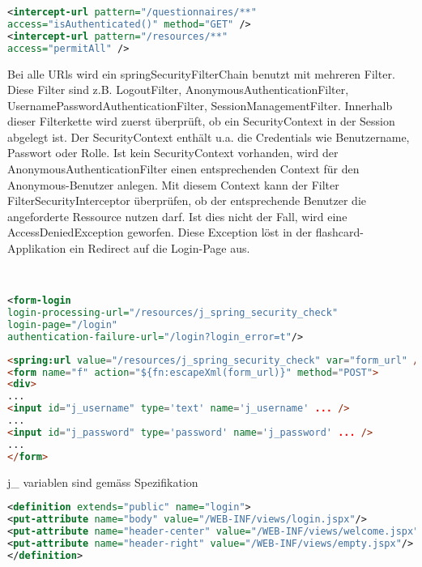 \documentclass[a4paper,10pt]{scrreprt}
\begin{document}
{\begin{description}
\begin{lstlisting}[caption=spring security xml,language=xml]
	<intercept-url pattern="/questionnaires/**"
access="isAuthenticated()" method="GET" />
<intercept-url pattern="/resources/**"
access="permitAll" />
\end{lstlisting}

\item[Authorizierung]  Bei alle URls wird ein springSecurityFilterChain benutzt mit mehreren Filter. Diese Filter sind z.B. LogoutFilter, AnonymousAuthenticationFilter,
UsernamePasswordAuthenticationFilter, SessionManagementFilter. Innerhalb dieser
Filterkette wird zuerst überprüft, ob ein SecurityContext in der Session abgelegt ist. Der
SecurityContext enthält u.a. die Credentials wie Benutzername, Passwort oder Rolle. Ist kein
SecurityContext vorhanden, wird der AnonymousAuthenticationFilter einen entsprechenden
Context für den Anonymous-Benutzer anlegen. Mit diesem Context kann der Filter
FilterSecurityInterceptor überprüfen, ob der entsprechende Benutzer die angeforderte
Ressource nutzen darf. Ist dies nicht der Fall, wird eine AccessDeniedException geworfen.
Diese Exception löst in der flashcard-Applikation ein Redirect auf die Login-Page aus.

\item[Leitung der Request auf Login Page] \hfill \\
\begin{lstlisting}[caption=security xml login weiterleitung,language=xml]
<form-login
login-processing-url="/resources/j_spring_security_check"
login-page="/login"
authentication-failure-url="/login?login_error=t"/>
\end{lstlisting}
	
\begin{lstlisting}[caption=login jspx spring security,language=html]
<spring:url value="/resources/j_spring_security_check" var="form_url" />
<form name="f" action="${fn:escapeXml(form_url)}" method="POST">
<div>
...
<input id="j_username" type='text' name='j_username' ... />
...
<input id="j_password" type='password' name='j_password' ... />
...
</form>
\end{lstlisting}

\begin{framed}
j\_ variablen sind gemäss Spezifikation
\end{framed}
\begin{lstlisting}[caption=spring security tiles Änderungen,language=xml]
<definition extends="public" name="login">
<put-attribute name="body" value="/WEB-INF/views/login.jspx"/>
<put-attribute name="header-center" value="/WEB-INF/views/welcome.jspx"/>
<put-attribute name="header-right" value="/WEB-INF/views/empty.jspx"/>
</definition>
\end{lstlisting}


\end{description}}
\end{document}
